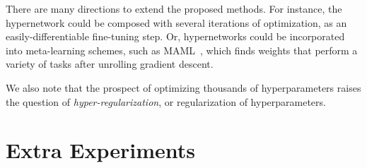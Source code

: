 \documentclass{article} %
\begin{document}
There are many directions to extend the proposed methods.
For instance, the hypernetwork could be composed with several iterations of optimization, as an easily-differentiable fine-tuning step.
Or, hypernetworks could be incorporated into meta-learning schemes, such as MAML~\citep{finn2017model}, which finds weights that perform a variety of tasks after unrolling gradient descent.

We also note that the prospect of optimizing thousands of hyperparameters raises the question of \emph{hyper-regularization}, or regularization of hyperparameters.
%




%
%
\newpage
\appendix
\section{Extra Experiments}
\end{document}
